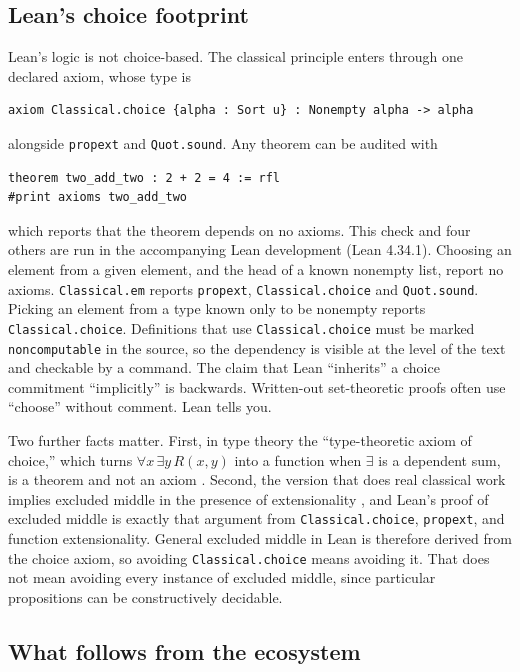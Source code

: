 \documentclass[11pt]{article}
\begin{document}
\subsection{Lean's choice footprint}

Lean's logic is not choice-based. The classical principle enters through one declared axiom, whose type is
\begin{lstlisting}
axiom Classical.choice {alpha : Sort u} : Nonempty alpha -> alpha
\end{lstlisting}
alongside \texttt{propext} and \texttt{Quot.sound}. Any theorem can be audited with
\begin{lstlisting}
theorem two_add_two : 2 + 2 = 4 := rfl
#print axioms two_add_two
\end{lstlisting}
which reports that the theorem depends on no axioms. This check and four others are run in the accompanying Lean development (Lean 4.34.1). Choosing an element from a given element, and the head of a known nonempty list, report no axioms. \texttt{Classical.em} reports \texttt{propext}, \texttt{Classical.choice} and \texttt{Quot.sound}. Picking an element from a type known only to be nonempty reports \texttt{Classical.choice}. Definitions that use \texttt{Classical.choice} must be marked \texttt{noncomputable} in the source, so the dependency is visible at the level of the text and checkable by a command. The claim that Lean ``inherits'' a choice commitment ``implicitly'' is backwards. Written-out set-theoretic proofs often use ``choose'' without comment. Lean tells you.

Two further facts matter. First, in type theory the ``type-theoretic axiom of choice,'' which turns $\forall x\,\exists y\,R(x,y)$ into a function when $\exists$ is a dependent sum, is a theorem and not an axiom \cite{martinlof1984}. Second, the version that does real classical work implies excluded middle in the presence of extensionality \cite{diaconescu1975,goodman1978}, and Lean's proof of excluded middle is exactly that argument from \texttt{Classical.choice}, \texttt{propext}, and function extensionality. General excluded middle in Lean is therefore derived from the choice axiom, so avoiding \texttt{Classical.choice} means avoiding it. That does not mean avoiding every instance of excluded middle, since particular propositions can be constructively decidable.

\subsection{What follows from the ecosystem}
\end{document}
